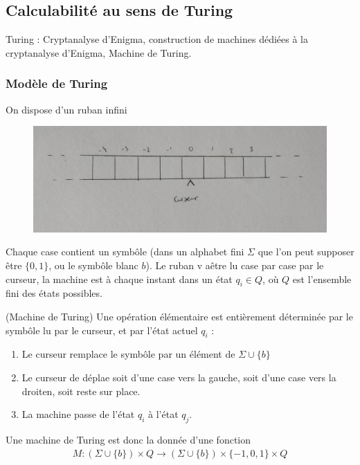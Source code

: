         \subsection{Calculabilité au sens de Turing}
            Turing : Cryptanalyse d'Enigma, construction de machines dédiées à la cryptanalyse d'Enigma, Machine de Turing.
            
            \subsubsection{Modèle de Turing}
                On dispose d'un ruban infini
                \begin{figure}[H]
                    \centering
                    \includegraphics[width=.5\textwidth]{01}
                \end{figure}
                Chaque case contient un symbôle (dans un alphabet fini $\Sigma$ que l'on peut supposer être $\{0, 1\}$, ou le symbôle blanc $b$). Le ruban v aêtre lu case par case par le curseur, la machine est à chaque instant dans un état $q_i \in Q$, où $Q$ est l'ensemble fini des états possibles.
                \begin{defi} (Machine de Turing)
                    Une opération élémentaire est entièrement déterminée par le symbôle lu par le curseur, et par l'état actuel $q_i$ :
                    \begin{enumerate}
                        \item Le curseur remplace le symbôle par un élément de $\Sigma \cup \{b\}$
                        \item Le curseur de déplae soit d'une case vers la gauche, soit d'une case vers la droiten, soit reste sur place.
                        \item La machine passe de l'état $q_i$ à l'état $q_j$.
                    \end{enumerate}
                    Une machine de Turing est donc la donnée d'une fonction
                    \begin{align*}
                        M : (\Sigma \cup \{b\}) \times Q \to (\Sigma \cup \{b\}) \times \{-1, 0, 1\} \times Q
                    \end{align*}
                \end{defi}
